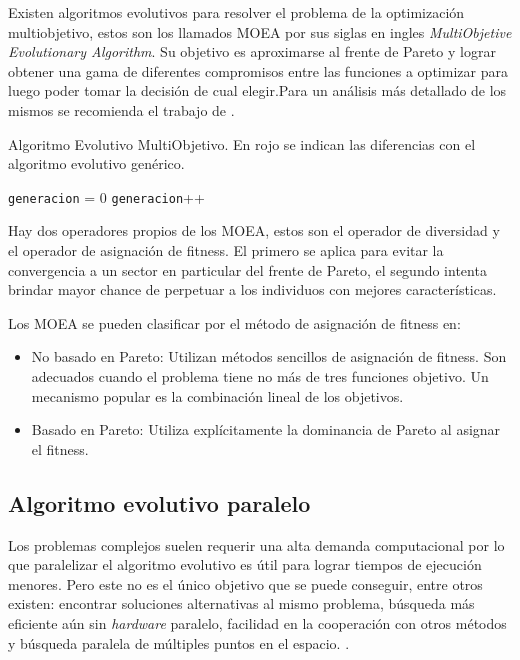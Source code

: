 Existen algoritmos evolutivos para resolver el problema de la optimización multiobjetivo, estos son los llamados MOEA por sus siglas en ingles \emph{ MultiObjetive Evolutionary Algorithm}. Su objetivo es aproximarse al frente de Pareto y lograr obtener una gama de diferentes compromisos entre las funciones a optimizar para luego poder tomar la decisión de cual elegir.Para un análisis más detallado de los mismos se recomienda el trabajo de \citet{Deb2001}.


\begin{algorithm}%
	\caption{Algoritmo Evolutivo MultiObjetivo. En rojo se indican las diferencias con el algoritmo evolutivo genérico.}
	\label{alg:algoritmo_genetico_multiobjetivo}
	\begin{algorithmic} [1] 
		{
			\STATE \texttt{generacion} = 0
			\STATE {\textcolor{red}{Operador Diversidad (Pob(generacion))}}
			\STATE {\textcolor{red}{Asignar Fitness (Pob(generacion))}}
			\STATE \texttt{generacion}++
			\ENDWHILE
			\RETURN 	{\textcolor{red}{Frente de Pareto}}
		}
	\end{algorithmic}
\end{algorithm}

Hay dos operadores propios de los MOEA, estos son el operador de diversidad y el operador de asignación de fitness. El primero se aplica para evitar la convergencia a un sector en particular del frente de Pareto, el segundo intenta brindar mayor chance de perpetuar a los individuos con mejores características.

Los MOEA se pueden clasificar por el método de asignación de fitness en:
\begin{itemize}
	\item No basado en Pareto: Utilizan métodos sencillos de asignación de fitness. Son adecuados cuando el problema tiene no más de tres funciones objetivo. Un mecanismo popular es la combinación lineal de los objetivos.
	\item Basado en Pareto: Utiliza explícitamente la dominancia de Pareto al asignar el fitness.
\end{itemize}



\subsection{Algoritmo evolutivo paralelo}
Los problemas complejos suelen requerir una alta demanda computacional por lo que paralelizar el algoritmo evolutivo es útil para lograr tiempos de ejecución menores. Pero este no es el único objetivo que se puede conseguir, entre otros existen: encontrar soluciones alternativas al mismo problema, búsqueda más eficiente aún sin \emph{hardware} paralelo, facilidad en la cooperación con otros métodos y búsqueda paralela de múltiples puntos en el espacio. \citep{Alba2002}. 

